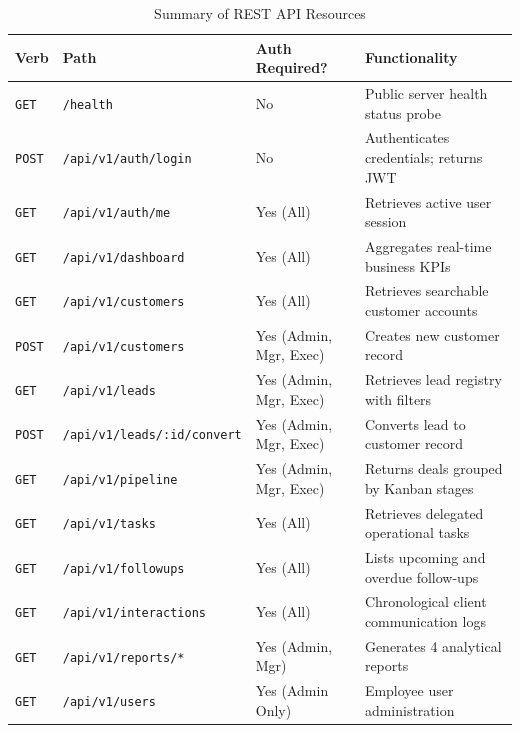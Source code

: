 \begin{table}[h!]
\centering
\caption{Summary of REST API Resources}
\renewcommand{\arraystretch}{1.2}
\begin{tabular}{|p{1.5cm}|p{4.5cm}|p{3cm}|p{5cm}|}
\hline
\textbf{Verb} & \textbf{Path} & \textbf{Auth Required?} & \textbf{Functionality} \\ \hline
\texttt{GET} & \texttt{/health} & No & Public server health status probe \\ \hline
\texttt{POST} & \texttt{/api/v1/auth/login} & No & Authenticates credentials; returns JWT \\ \hline
\texttt{GET} & \texttt{/api/v1/auth/me} & Yes (All) & Retrieves active user session \\ \hline
\texttt{GET} & \texttt{/api/v1/dashboard} & Yes (All) & Aggregates real-time business KPIs \\ \hline
\texttt{GET} & \texttt{/api/v1/customers} & Yes (All) & Retrieves searchable customer accounts \\ \hline
\texttt{POST} & \texttt{/api/v1/customers} & Yes (Admin, Mgr, Exec) & Creates new customer record \\ \hline
\texttt{GET} & \texttt{/api/v1/leads} & Yes (Admin, Mgr, Exec) & Retrieves lead registry with filters \\ \hline
\texttt{POST} & \texttt{/api/v1/leads/:id/convert} & Yes (Admin, Mgr, Exec) & Converts lead to customer record \\ \hline
\texttt{GET} & \texttt{/api/v1/pipeline} & Yes (Admin, Mgr, Exec) & Returns deals grouped by Kanban stages \\ \hline
\texttt{GET} & \texttt{/api/v1/tasks} & Yes (All) & Retrieves delegated operational tasks \\ \hline
\texttt{GET} & \texttt{/api/v1/followups} & Yes (All) & Lists upcoming and overdue follow-ups \\ \hline
\texttt{GET} & \texttt{/api/v1/interactions} & Yes (All) & Chronological client communication logs \\ \hline
\texttt{GET} & \texttt{/api/v1/reports/*} & Yes (Admin, Mgr) & Generates 4 analytical reports \\ \hline
\texttt{GET} & \texttt{/api/v1/users} & Yes (Admin Only) & Employee user administration \\ \hline
\end{tabular}
\end{table}

